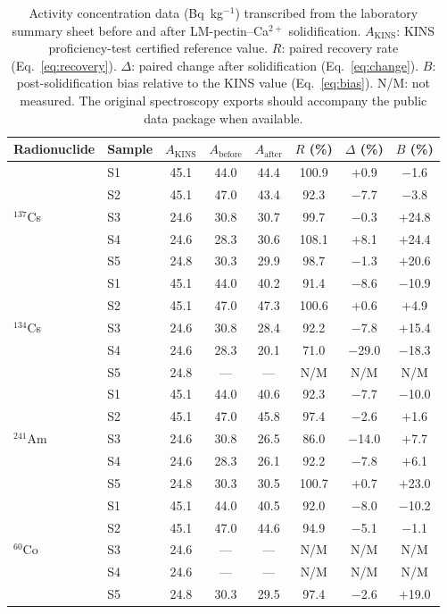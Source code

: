 \documentclass[preprint,12pt]{elsarticle}
\begin{document}
\begin{table}[htbp]
\footnotesize
\caption{Activity concentration data (Bq~kg$^{-1}$) transcribed from the
  laboratory summary sheet before and after LM-pectin--Ca$^{2+}$
  solidification.
  $A_{\text{KINS}}$: KINS proficiency-test certified reference value.
  $R$: paired recovery rate (Eq.~\ref{eq:recovery}).
  $\Delta$: paired change after solidification (Eq.~\ref{eq:change}).
  $B$: post-solidification bias relative to the KINS value
  (Eq.~\ref{eq:bias}).
  N/M: not measured.
  The original spectroscopy exports should accompany the public data
  package when available.}
\label{tab:rawdata}
\centering
\begin{tabular}{llcccccc}
\toprule
Radionuclide & Sample &
  $A_{\text{KINS}}$ & $A_{\text{before}}$ & $A_{\text{after}}$ &
  $R$ (\%) & $\Delta$ (\%) & $B$ (\%) \\
\midrule
\multirow{5}{*}{$^{137}$Cs}
  & S1 & 45.1 & 44.0  & 44.4  & 100.9 & $+$0.9 & $-$1.6 \\
  & S2 & 45.1 & 47.0  & 43.4  &  92.3 & $-$7.7 & $-$3.8 \\
  & S3 & 24.6 & 30.8  & 30.7  &  99.7 & $-$0.3 & $+$24.8 \\
  & S4 & 24.6 & 28.3  & 30.6  & 108.1 & $+$8.1 & $+$24.4 \\
  & S5 & 24.8 & 30.3  & 29.9  &  98.7 & $-$1.3 & $+$20.6 \\
\midrule
\multirow{5}{*}{$^{134}$Cs}
  & S1 & 45.1 & 44.0  & 40.2  &  91.4 & $-$8.6 & $-$10.9 \\
  & S2 & 45.1 & 47.0  & 47.3  & 100.6 & $+$0.6 & $+$4.9 \\
  & S3 & 24.6 & 30.8  & 28.4  &  92.2 & $-$7.8 & $+$15.4 \\
  & S4 & 24.6 & 28.3  & 20.1  &  71.0 & $-$29.0 & $-$18.3 \\
  & S5 & 24.8 & ---   & ---   & N/M   & N/M & N/M \\
\midrule
\multirow{5}{*}{$^{241}$Am}
  & S1 & 45.1 & 44.0  & 40.6  &  92.3 & $-$7.7 & $-$10.0 \\
  & S2 & 45.1 & 47.0  & 45.8  &  97.4 & $-$2.6 & $+$1.6 \\
  & S3 & 24.6 & 30.8  & 26.5  &  86.0 & $-$14.0 & $+$7.7 \\
  & S4 & 24.6 & 28.3  & 26.1  &  92.2 & $-$7.8 & $+$6.1 \\
  & S5 & 24.8 & 30.3  & 30.5  & 100.7 & $+$0.7 & $+$23.0 \\
\midrule
\multirow{5}{*}{$^{60}$Co}
  & S1 & 45.1 & 44.0  & 40.5  &  92.0 & $-$8.0 & $-$10.2 \\
  & S2 & 45.1 & 47.0  & 44.6  &  94.9 & $-$5.1 & $-$1.1 \\
  & S3 & 24.6 & ---   & ---   & N/M   & N/M & N/M \\
  & S4 & 24.6 & ---   & ---   & N/M   & N/M & N/M \\
  & S5 & 24.8 & 30.3  & 29.5  &  97.4 & $-$2.6 & $+$19.0 \\
\bottomrule
\end{tabular}
\end{table}
\end{document}
